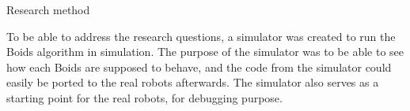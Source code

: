 Research method

To be able to address the research questions, a simulator was created to run the Boids algorithm in simulation. The purpose of the simulator was to be able to see how each Boids are supposed to behave, and the code from the simulator could easily be ported to the real robots afterwards. The simulator also serves as a starting point for the real robots, for debugging purpose.

